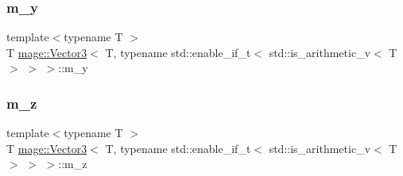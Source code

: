 \subsubsection{\texorpdfstring{m\+\_\+y}{m\_y}}
{\footnotesize\ttfamily template$<$typename T $>$ \\
T \hyperlink{structmage_1_1_vector3}{mage\+::\+Vector3}$<$ T, typename std\+::enable\+\_\+if\+\_\+t$<$ std\+::is\+\_\+arithmetic\+\_\+v$<$ T $>$ $>$ $>$\+::m\+\_\+y}

\hypertarget{structmage_1_1_vector3_3_01_t_00_01typename_01std_1_1enable__if__t_3_01std_1_1is__arithmetic__v_3_01_t_01_4_01_4_01_4_a7a7a8f5a5989489d2d08eb058af86461}{}\label{structmage_1_1_vector3_3_01_t_00_01typename_01std_1_1enable__if__t_3_01std_1_1is__arithmetic__v_3_01_t_01_4_01_4_01_4_a7a7a8f5a5989489d2d08eb058af86461} 
\subsubsection{\texorpdfstring{m\+\_\+z}{m\_z}}
{\footnotesize\ttfamily template$<$typename T $>$ \\
T \hyperlink{structmage_1_1_vector3}{mage\+::\+Vector3}$<$ T, typename std\+::enable\+\_\+if\+\_\+t$<$ std\+::is\+\_\+arithmetic\+\_\+v$<$ T $>$ $>$ $>$\+::m\+\_\+z}

